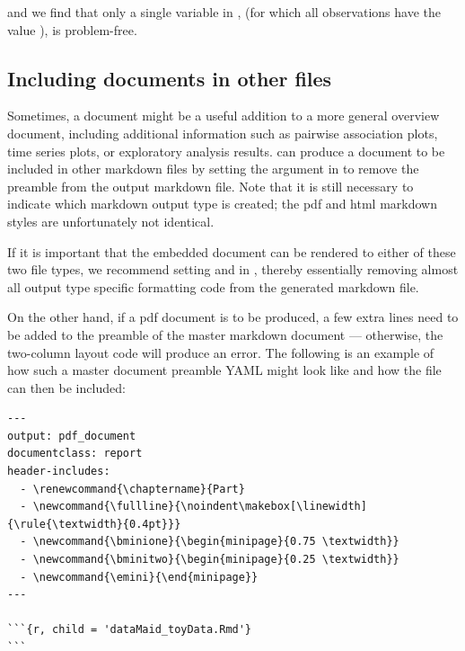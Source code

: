 \documentclass[article,shortnames]{jss}
\newcommand{\hl}[1]{\textcolor{magenta}{#1}}
\begin{document}
and we find that only a single variable in ,  (for which all
observations have the value ), is problem-free.


\subsection[Including dataMaid documents in other files]{Including  documents in other files}
Sometimes, a  document might be a useful addition to a
more general overview document, including additional information such
as pairwise association plots, time series plots, or exploratory
analysis results.   can produce a document to be
included in other  markdown files by setting the
 argument in  to remove the preamble
from the output  markdown file. Note that it is still
necessary to indicate which  markdown output type is
created; the pdf and html  markdown styles are
unfortunately not identical.

If it is important that the embedded  document can be
rendered to either of these two file types, we recommend setting
 and  in , thereby
essentially removing almost all output type specific formatting code
from the generated  markdown file.

On the other hand, if a pdf document is to be produced, a few extra
lines need to be added to the preamble of the master  markdown
document --- otherwise, the two-column layout code will produce an
error. The following is an example of how such a master document
preamble YAML might look like and how the  file can
then be included:

{\small
\begin{Verbatim}
---
output: pdf_document
documentclass: report
header-includes:
  - \renewcommand{\chaptername}{Part}
  - \newcommand{\fullline}{\noindent\makebox[\linewidth]{\rule{\textwidth}{0.4pt}}}
  - \newcommand{\bminione}{\begin{minipage}{0.75 \textwidth}}
  - \newcommand{\bminitwo}{\begin{minipage}{0.25 \textwidth}}
  - \newcommand{\emini}{\end{minipage}}
---

```{r, child = 'dataMaid_toyData.Rmd'}
```
\end{Verbatim}
}
\end{document}
